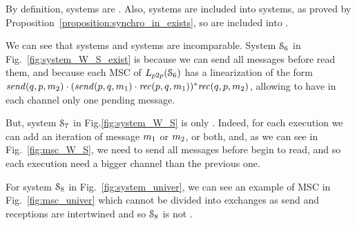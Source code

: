 By definition,  systems are \wS{}.
Also,  systems are included into  systems, as proved by Proposition~\ref{proposition:synchro_in_exists}, so  are included into .

We can see that \wS{} systems and \eb{} systems are incomparable. System
$\mathcal{S}_{6}$ in Fig.~\ref{fig:system_W_S_exist} is \wS{}
because we
can send all messages before read them, and  because each MSC of
$\ppL{\systemWSexist}$ has a linearization of the form $\mathit{send}(q, p, m_2) \cdot
(\mathit{send}(p, q, m_1) \cdot \mathit{rec}(p, q, m_1))^* \mathit{rec}(q, p, m_2)$,  allowing
to have in each channel only one pending message.

\begin{center}
  \begin{minipage}[c]{6cm}
    
\end{minipage}
\hspace*{1cm}
\begin{minipage}[c]{3.5cm}
  
\end{minipage}
\end{center}


But, system $\mathcal{S}_{7}$ in
Fig.\ref{fig:system_W_S} is only \wS{}. Indeed, for each execution we can add an
iteration of message $m_1$ or $m_2$, or both, and, as we can see in
Fig.~\ref{fig:msc_W_S}, we need to send all
messages before begin to read, and so each execution need a bigger channel than
the previous one.
\begin{center}
  \begin{minipage}[c]{6cm}

\end{minipage}
\hspace*{1cm}
\begin{minipage}[c]{3.5cm}

\end{minipage}
\end{center}

For system $\mathcal{S}_{8}$ in Fig.~\ref{fig:system_univer}, we
can see an example of MSC in Fig.~\ref{fig:msc_univer} which cannot be divided
into exchanges as send and receptions are intertwined and so $\mathcal{S}_{8}$ is not
\wS{}.

\begin{center}
  \begin{minipage}[c]{6cm}
    
\end{minipage}
\hspace*{1cm}
\begin{minipage}[c]{3.5cm}
  
\end{minipage}
\end{center}




